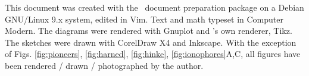 \newpage
This document was created with the \LaTeXe \, document preparation package on a Debian GNU/Linux 9.x system, edited in Vim. Text and math typeset in Computer Modern.
The diagrams were rendered with Gnuplot and \LaTeXe's  own renderer, Tikz.
The sketches were drawn with CorelDraw X4 and Inkscape.
With the exception of Figs. \ref{fig:pioneers}, \ref{fig:harned}, \ref{fig:hinke}, \ref{fig:ionophores}A,C, all figures have been rendered / drawn / photographed by the author.
